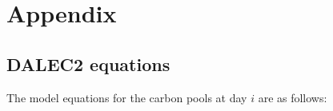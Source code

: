 \documentclass[draft,linenumbers]{agujournal}
\begin{document}


%
%
%
%
\appendix
\section{Appendix} \label{sec:appendix}

\subsection{DALEC2 equations} \label{sec:dalec_eqns}

The model equations for the carbon pools at day $i$ are as follows:
\end{document}
